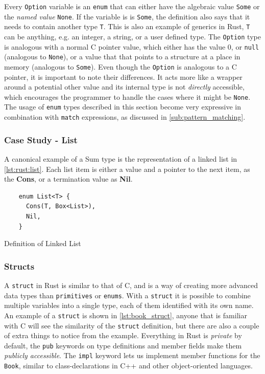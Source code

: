 Every \texttt{Option} variable is an \texttt{enum} that can either have the algebraic value \texttt{Some} or the \emph{named value} \texttt{None}.
If the variable is is \texttt{Some}, the definition also says that it needs to contain another type \texttt{T}.
This is also an example of generics in Rust, \texttt{T} can be anything, e.g. an integer, a string, or a user defined type.
The \texttt{Option} type is analogous with a normal C pointer value, which either has the value 0, or \texttt{null} (analogous to \texttt{None}), or a value that that points to a structure at a place in memory (analogous to \texttt{Some}).
Even though the \texttt{Option} is analogous to a C pointer, it is important to note their differences.
It acts more like a wrapper around a potential other value and its internal type is not \emph{directly} accessible, which encourages the programmer to handle the cases where it might be \texttt{None}.
The usage of \texttt{enum} types described in this section become very expressive in combination with \texttt{match} expressions, as discussed in \autoref{sub:pattern_matching}.

\subsubsection{Case Study - List}

A canonical example of a Sum type is the representation of a linked list in \autoref{lst:rust:list}.
Each list item is either a value and a pointer to the next item, as the \textbf{Cons}, or a termination value as \textbf{Nil}.

\begin{listing}[H]
  \begin{verbatim}
    enum List<T> {
      Cons(T, Box<List>),
      Nil,
    }
  \end{verbatim}
  \caption{Definition of Linked List}
  \label{lst:rust:list}
\end{listing}

\subsubsection{Structs}
\label{ssub:structs}

A \texttt{struct} in Rust is similar to that of C, and is a way of creating more advanced data types than \texttt{primitives} or \texttt{enums}.
With a \texttt{struct} it is possible to combine multiple variables into a single type, each of them identified with its own name.
An example of a \texttt{struct} is shown in \autoref{lst:book_struct}, anyone that is familiar with C will see the similarity of the \texttt{struct} definition, but there are also a couple of extra things to notice from the example.
Everything in Rust is \emph{private} by default, the \texttt{pub} keywords on type definitions and member fields make them \emph{publicly accessible}.
The \texttt{impl} keyword lets us implement member functions for the \texttt{Book}, similar to class-declarations in C++ and other object-oriented languages.

